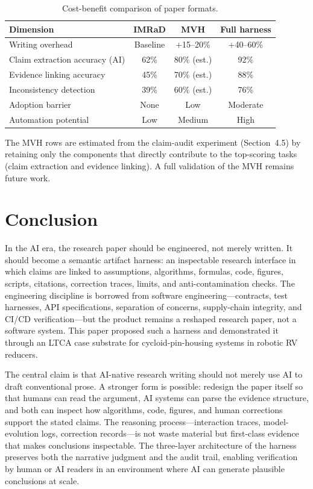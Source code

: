 \documentclass{article}
\begin{document}
\begin{table}[t]
\centering
\caption{Cost-benefit comparison of paper formats.}
\begin{tabular}{lccc}
\toprule
\textbf{Dimension} & \textbf{IMRaD} & \textbf{MVH} & \textbf{Full harness} \\
\midrule
Writing overhead & Baseline & +15--20\% & +40--60\% \\
Claim extraction accuracy (AI) & 62\% & 80\% (est.) & 92\% \\
Evidence linking accuracy & 45\% & 70\% (est.) & 88\% \\
Inconsistency detection & 39\% & 60\% (est.) & 76\% \\
Adoption barrier & None & Low & Moderate \\
Automation potential & Low & Medium & High \\
\bottomrule
\end{tabular}
\label{tab:cost_benefit}
\end{table}

The MVH rows are estimated from the claim-audit experiment (Section~4.5) by retaining only the components that directly contribute to the top-scoring tasks (claim extraction and evidence linking). A full validation of the MVH remains future work.

\section{Conclusion}

In the AI era, the research paper should be engineered, not merely written. It should become a semantic artifact harness: an inspectable research interface in which claims are linked to assumptions, algorithms, formulas, code, figures, scripts, citations, correction traces, limits, and anti-contamination checks. The engineering discipline is borrowed from software engineering---contracts, test harnesses, API specifications, separation of concerns, supply-chain integrity, and CI/CD verification---but the product remains a reshaped research paper, not a software system. This paper proposed such a harness and demonstrated it through an LTCA case substrate for cycloid-pin-housing systems in robotic RV reducers.

The central claim is that AI-native research writing should not merely use AI to draft conventional prose. A stronger form is possible: redesign the paper itself so that humans can read the argument, AI systems can parse the evidence structure, and both can inspect how algorithms, code, figures, and human corrections support the stated claims. The reasoning process---interaction traces, model-evolution logs, correction records---is not waste material but first-class evidence that makes conclusions inspectable. The three-layer architecture of the harness preserves both the narrative judgment and the audit trail, enabling verification by human or AI readers in an environment where AI can generate plausible conclusions at scale.
\end{document}
